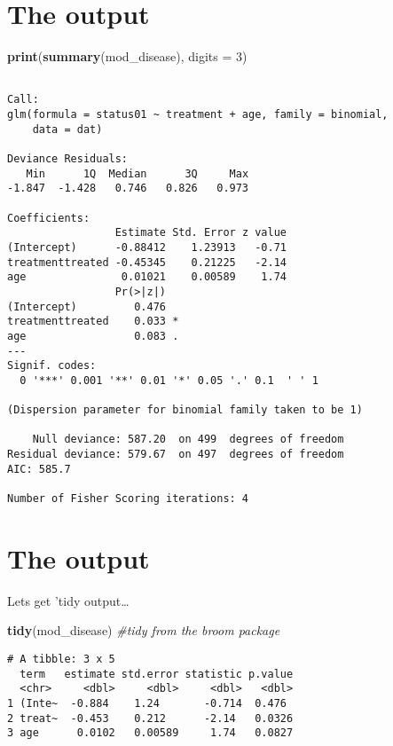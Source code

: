\documentclass[]{tufte-handout}
\newenvironment{Shaded}{}{}
\newcommand{\CommentTok}[1]{\textcolor[rgb]{0.38,0.63,0.69}{\textit{#1}}}
\newcommand{\DataTypeTok}[1]{\textcolor[rgb]{0.56,0.13,0.00}{#1}}
\newcommand{\DecValTok}[1]{\textcolor[rgb]{0.25,0.63,0.44}{#1}}
\newcommand{\KeywordTok}[1]{\textcolor[rgb]{0.00,0.44,0.13}{\textbf{#1}}}
\newcommand{\NormalTok}[1]{#1}
\begin{document}
\hypertarget{the-output-1}{%
\section{The output}\label{the-output-1}}

\begin{Shaded}
\begin{Highlighting}[]
\KeywordTok{print}\NormalTok{(}\KeywordTok{summary}\NormalTok{(mod_disease), }\DataTypeTok{digits =} \DecValTok{3}\NormalTok{)}
\end{Highlighting}
\end{Shaded}

\begin{verbatim}

Call:
glm(formula = status01 ~ treatment + age, family = binomial, 
    data = dat)

Deviance Residuals: 
   Min      1Q  Median      3Q     Max  
-1.847  -1.428   0.746   0.826   0.973  

Coefficients:
                 Estimate Std. Error z value
(Intercept)      -0.88412    1.23913   -0.71
treatmenttreated -0.45345    0.21225   -2.14
age               0.01021    0.00589    1.74
                 Pr(>|z|)  
(Intercept)         0.476  
treatmenttreated    0.033 *
age                 0.083 .
---
Signif. codes:  
  0 '***' 0.001 '**' 0.01 '*' 0.05 '.' 0.1  ' ' 1

(Dispersion parameter for binomial family taken to be 1)

    Null deviance: 587.20  on 499  degrees of freedom
Residual deviance: 579.67  on 497  degrees of freedom
AIC: 585.7

Number of Fisher Scoring iterations: 4
\end{verbatim}

\hypertarget{the-output-2}{%
\section{The output}\label{the-output-2}}

Lets get 'tidy output\ldots{}

\begin{Shaded}
\begin{Highlighting}[]
\KeywordTok{tidy}\NormalTok{(mod_disease)  }\CommentTok{#tidy from the broom package}
\end{Highlighting}
\end{Shaded}

\begin{verbatim}
# A tibble: 3 x 5
  term   estimate std.error statistic p.value
  <chr>     <dbl>     <dbl>     <dbl>   <dbl>
1 (Inte~  -0.884    1.24       -0.714  0.476 
2 treat~  -0.453    0.212      -2.14   0.0326
3 age      0.0102   0.00589     1.74   0.0827
\end{verbatim}
\end{document}
